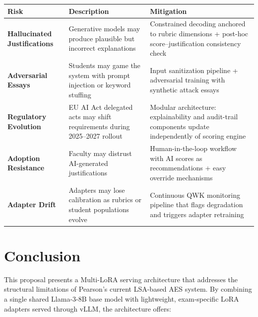 \documentclass[12pt]{article}
\begin{document}
\renewcommand{\arraystretch}{1.4}
\begin{table}[H]
\centering
\small
\begin{tabular}{@{} >{\bfseries}p{3.2cm} p{4.8cm} p{5.5cm} @{}}
\toprule
\textbf{Risk} & \textbf{Description} & \textbf{Mitigation} \\
\midrule
Hallucinated Justifications & Generative models may produce plausible but incorrect explanations & Constrained decoding anchored to rubric dimensions + post-hoc score--justification consistency check \\
Adversarial Essays & Students may game the system with prompt injection or keyword stuffing & Input sanitization pipeline + adversarial training with synthetic attack essays \\
Regulatory Evolution & EU AI Act delegated acts may shift requirements during 2025--2027 rollout & Modular architecture: explainability and audit-trail components update independently of scoring engine \\
Adoption Resistance & Faculty may distrust AI-generated justifications & Human-in-the-loop workflow with AI scores as recommendations + easy override mechanisms \\
Adapter Drift & Adapters may lose calibration as rubrics or student populations evolve & Continuous QWK monitoring pipeline that flags degradation and triggers adapter retraining \\
\bottomrule
\end{tabular}
\end{table}
\renewcommand{\arraystretch}{1.0}

\section{Conclusion}

This proposal presents a Multi-LoRA serving architecture that addresses the structural limitations of Pearson's current LSA-based AES system. By combining a single shared Llama-3-8B base model with lightweight, exam-specific LoRA adapters served through vLLM, the architecture offers:
\end{document}

